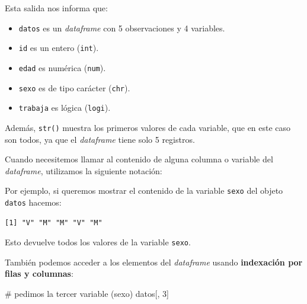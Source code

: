 \documentclass[
  spanish,
  a4paper,
]{scrbook}
\newenvironment{Shaded}{\begin{snugshade}}{\end{snugshade}}
\newcommand{\CommentTok}[1]{\textcolor[rgb]{0.37,0.37,0.37}{#1}}
\newcommand{\DecValTok}[1]{\textcolor[rgb]{0.68,0.00,0.00}{#1}}
\newcommand{\NormalTok}[1]{\textcolor[rgb]{0.00,0.23,0.31}{#1}}
\newcommand{\SpecialCharTok}[1]{\textcolor[rgb]{0.37,0.37,0.37}{#1}}
\begin{document}
Esta salida nos informa que:

\begin{itemize}
\item
  \texttt{datos} es un \emph{dataframe} con 5 observaciones y 4
  variables.
\item
  \texttt{id} es un entero (\texttt{int}).
\item
  \texttt{edad} es numérica (\texttt{num}).
\item
  \texttt{sexo} es de tipo carácter (\texttt{chr}).
\item
  \texttt{trabaja} es lógica (\texttt{logi}).
\end{itemize}

Además, \texttt{str()} muestra los primeros valores de cada variable,
que en este caso son todos, ya que el \emph{dataframe} tiene solo 5
registros.

Cuando necesitemos llamar al contenido de alguna columna o variable del
\emph{dataframe}, utilizamos la siguiente notación:

\begin{Shaded}
\end{Shaded}

Por ejemplo, si queremos mostrar el contenido de la variable
\texttt{sexo} del objeto \texttt{datos} hacemos:

\begin{Shaded}
\end{Shaded}

\begin{verbatim}
[1] "V" "M" "M" "V" "M"
\end{verbatim}

Esto devuelve todos los valores de la variable \texttt{sexo}.

También podemos acceder a los elementos del \emph{dataframe} usando
\textbf{indexación por filas y columnas}:

\begin{Shaded}
\begin{Highlighting}[]
\CommentTok{\# pedimos la tercer variable (sexo)}
\NormalTok{datos[, }\DecValTok{3}\NormalTok{]}
\end{Highlighting}
\end{Shaded}
\end{document}
